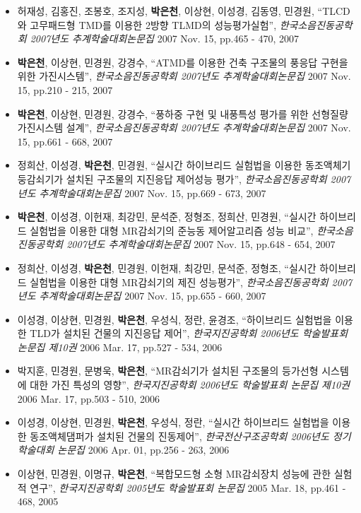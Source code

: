 \begin{itemize}
\item
  허재성, 김홍진, 조봉호, 조지성, \textbf{박은천}, 이상현, 이성경,
  김동영, 민경원, ``TLCD와 고무패드형 TMD를 이용한 2방향 TLMD의
  성능평가실험'', \emph{한국소음진동공학회 2007년도 추계학술대회논문집}
  2007 Nov. 15, pp.465 - 470, 2007
\item
  \textbf{박은천}, 이상현, 민경원, 강경수, ``ATMD를 이용한 건축 구조물의
  풍응답 구현을 위한 가진시스템'', \emph{한국소음진동공학회 2007년도
  추계학술대회논문집} 2007 Nov. 15, pp.210 - 215, 2007
\item
  \textbf{박은천}, 이상현, 민경원, 강경수, ``풍하중 구현 및 내풍특성
  평가를 위한 선형질량 가진시스템 설계'', \emph{한국소음진동공학회
  2007년도 추계학술대회논문집} 2007 Nov. 15, pp.661 - 668, 2007
\item
  정희산, 이성경, \textbf{박은천}, 민경원, ``실시간 하이브리드 실험법을
  이용한 동조액체기둥감쇠기가 설치된 구조물의 지진응답 제어성능 평가'',
  \emph{한국소음진동공학회 2007년도 추계학술대회논문집} 2007 Nov. 15,
  pp.669 - 673, 2007
\item
  \textbf{박은천}, 이성경, 이헌재, 최강민, 문석준, 정형조, 정희산,
  민경원, ``실시간 하이브리드 실험법을 이용한 대형 MR감쇠기의 준능동
  제어알고리즘 성능 비교'', \emph{한국소음진동공학회 2007년도
  추계학술대회논문집} 2007 Nov. 15, pp.648 - 654, 2007
\item
  정희산, 이성경, \textbf{박은천}, 민경원, 이헌재, 최강민, 문석준,
  정형조, ``실시간 하이브리드 실험법을 이용한 대형 MR감쇠기의 제진
  성능평가'', \emph{한국소음진동공학회 2007년도 추계학술대회논문집} 2007
  Nov. 15, pp.655 - 660, 2007
\item
  이성경, 이상현, 민경원, \textbf{박은천}, 우성식, 정란, 윤경조,
  ``하이브리드 실험법을 이용한 TLD가 설치된 건물의 지진응답 제어'',
  \emph{한국지진공학회 2006년도 학술발표회 논문집 제10권} 2006 Mar. 17,
  pp.527 - 534, 2006
\item
  박지훈, 민경원, 문병욱, \textbf{박은천}, ``MR감쇠기가 설치된 구조물의
  등가선형 시스템에 대한 가진 특성의 영향'', \emph{한국지진공학회
  2006년도 학술발표회 논문집 제10권} 2006 Mar. 17, pp.503 - 510, 2006
\item
  이성경, 이상현, 민경원, \textbf{박은천}, 우성식, 정란, ``실시간
  하이브리드 실험법을 이용한 동조액체댐퍼가 설치된 건물의 진동제어'',
  \emph{한국전산구조공학회 2006년도 정기 학술대회 논문집} 2006 Apr. 01,
  pp.256 - 263, 2006
\item
  이상현, 민경원, 이명규, \textbf{박은천}, ``복합모드형 소형 MR감쇠장치
  성능에 관한 실험적 연구'', \emph{한국지진공학회 2005년도 학술발표회
  논문집} 2005 Mar. 18, pp.461 - 468, 2005
\end{itemize}


